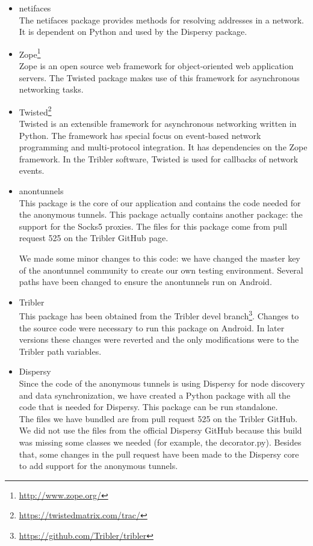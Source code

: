 \begin{itemize}
			\item netifaces\\
			The netifaces package provides methods for resolving addresses in a network. It is dependent on Python and used by the Dispersy package.
		
			\item Zope\footnote{\url{http://www.zope.org/}}\\
			Zope is an open source web framework for object-oriented web application servers. The Twisted package makes use of this framework for asynchronous networking tasks.
		
			\item Twisted\footnote{\url{https://twistedmatrix.com/trac/}}\\
			Twisted is an extensible framework for asynchronous networking written in Python. The framework has special focus on event-based network programming and multi-protocol integration. It has dependencies on the Zope framework. In the Tribler software, Twisted is used for callbacks of network events.
		
			\item anontunnels\\
			This package is the core of our application and contains the code needed for the anonymous tunnels. This package actually contains another package: the support for the Socks5 proxies. The files for this package come from pull request 525 on the Tribler GitHub page.
			
			We made some minor changes to this code: we have changed the master key of the anontunnel community to create our own testing environment. Several paths have been changed to ensure the anontunnels run on Android.
			
			\item Tribler\\
			This package has been obtained from the Tribler devel branch\footnote{\url{https://github.com/Tribler/tribler}}. Changes to the source code were necessary to run this package on Android. In later versions these changes were reverted and the only modifications were to the Tribler path variables.
			
			\item Dispersy\\
			Since the code of the anonymous tunnels is using Dispersy for node discovery and data synchronization, we have created a Python package with all the code that is needed for Dispersy. This package can be run standalone.\\
			The files we have bundled are from pull request 525 on the Tribler GitHub. We did not use the files from the official Dispersy GitHub because this build was missing some classes we needed (for example, the decorator.py). Besides that, some changes in the pull request have been made to the Dispersy core to add support for the anonymous tunnels.
		
		\end{itemize}
	
